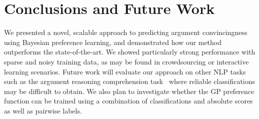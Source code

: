 \section{Conclusions and Future Work}

We presented a novel, scalable approach to predicting argument convincingness 
using Bayesian preference learning, and demonstrated how our method outperforms the state-of-the-art.
We showed particularly strong performance with sparse and noisy training data,
as may be found in crowdsourcing or interactive learning scenarios.
Future work will evaluate our approach on other NLP tasks 
such as the argument reasoning comprehension task~\cite{habernal2017arg} where reliable
classifications may be difficult to obtain.
We also plan to investigate whether the GP preference function can be trained 
using a combination of classifications and absolute scores as well as pairwise labels.
